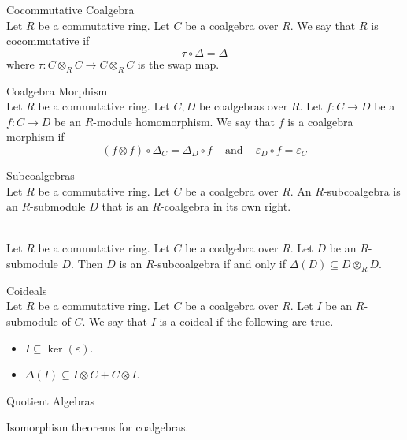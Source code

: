 \documentclass[a4paper]{article}
\begin{document}
\begin{defn}{Cocommutative Coalgebra}{}\\
Let $R$ be a commutative ring. Let $C$ be a coalgebra over $R$. We say that $R$ is cocommutative if $$\tau\circ\Delta=\Delta$$ where $\tau:C\otimes_RC\to C\otimes_RC$ is the swap map. 
\end{defn}

\begin{defn}{Coalgebra Morphism}{}\\
Let $R$ be a commutative ring. Let $C,D$ be coalgebras over $R$. Let $f:C\to D$ be a $f:C\to D$ be an $R$-module homomorphism. We say that $f$ is a coalgebra morphism if $$(f\otimes f)\circ\Delta_C=\Delta_D\circ f\;\;\;\text{ and }\;\;\;\varepsilon_D\circ f=\varepsilon_C$$
\end{defn}

\begin{defn}{Subcoalgebras}{}\\
Let $R$ be a commutative ring. Let $C$ be a coalgebra over $R$. An $R$-subcoalgebra is an $R$-submodule $D$ that is an $R$-coalgebra in its own right. 
\end{defn}

\begin{lmm}{}{}\\
Let $R$ be a commutative ring. Let $C$ be a coalgebra over $R$. Let $D$ be an $R$-submodule $D$. Then $D$ is an $R$-subcoalgebra if and only if $\Delta(D)\subseteq D\otimes_RD$. 
\end{lmm}

\begin{defn}{Coideals}{}\\
Let $R$ be a commutative ring. Let $C$ be a coalgebra over $R$. Let $I$ be an $R$-submodule of $C$. We say that $I$ is a coideal if the following are true. 
\begin{itemize}
\item $I\subseteq\ker(\varepsilon)$. 
\item $\Delta(I)\subseteq I\otimes C+C\otimes I$. 
\end{itemize}
\end{defn}

\begin{defn}{Quotient Algebras}{}\\
\end{defn}

Isomorphism theorems for coalgebras. 
\end{document}
